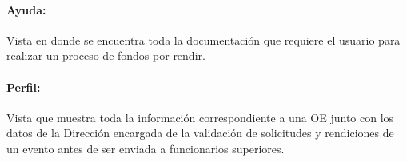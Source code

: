 \paragraph{Ayuda: }Vista en donde se encuentra toda la documentación que requiere el usuario para realizar un proceso de fondos por rendir.

\paragraph{Perfil: }Vista que muestra toda la información correspondiente a una OE junto con los datos de la Dirección encargada de la validación de solicitudes y rendiciones de un evento antes de ser enviada a funcionarios superiores.